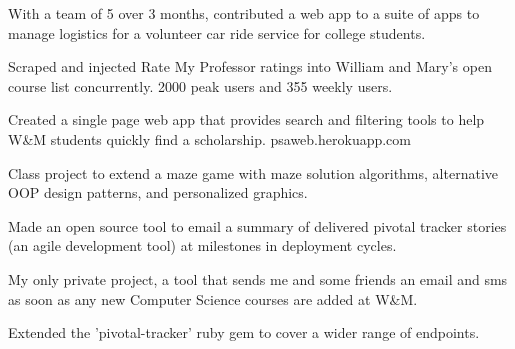 \documentclass[letterpaper]{deedy-resume} %
\begin{document}
\begin{minipage}[t]{0.66\textwidth}
With a team of 5 over 3 months, contributed a web app to a suite of apps to manage logistics for a volunteer car ride service for college students.

\sectionspace %

Scraped and injected Rate My Professor ratings into William and Mary's open course list concurrently. 2000 peak users and 355 weekly users.

\sectionspace %


Created a single page web app that provides search and filtering tools to help W\&M students quickly find a scholarship. psaweb.herokuapp.com

\sectionspace %



Class project to extend a maze game with maze solution algorithms, alternative OOP design patterns, and personalized graphics.
\sectionspace %



Made an open source tool to email a summary of delivered pivotal tracker stories (an agile development tool) at milestones in deployment cycles.
\sectionspace %

My only private project, a tool that sends me and some friends an email and sms as soon as any new Computer Science courses are added at W\&M.
\sectionspace %



Extended the 'pivotal-tracker' ruby gem to cover a wider range of endpoints.
\sectionspace %



\end{minipage}
\end{document}
